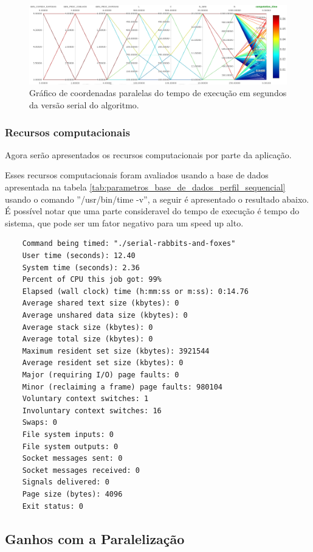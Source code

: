 \documentclass{article}
\begin{document}
\begin{figure}[H]
	\begin{center}
		\includegraphics[width=1.0\linewidth]{./parallel_coordinates.png}
	\end{center}
	\caption{Gráfico de coordenadas paralelas do tempo de execução em segundos da versão serial do algoritmo.}
	\label{fig:parallel_coordinates}
\end{figure}


\subsubsection{Recursos computacionais}

Agora serão apresentados os recursos computacionais por parte da aplicação.

Esses recursos computacionais foram avaliados usando a base de dados apresentada na tabela \ref{tab:parametros_base_de_dados_perfil_sequencial} usando o comando ''/usr/bin/time -v'', a seguir é apresentado o resultado abaixo. É possível notar que uma parte consideravel do tempo de execução é tempo do sistema, que pode ser um fator negativo para um speed up alto.


	{
		\scriptsize
		\begin{verbatim}
	Command being timed: "./serial-rabbits-and-foxes"
	User time (seconds): 12.40
	System time (seconds): 2.36
	Percent of CPU this job got: 99%
	Elapsed (wall clock) time (h:mm:ss or m:ss): 0:14.76
	Average shared text size (kbytes): 0
	Average unshared data size (kbytes): 0
	Average stack size (kbytes): 0
	Average total size (kbytes): 0
	Maximum resident set size (kbytes): 3921544
	Average resident set size (kbytes): 0
	Major (requiring I/O) page faults: 0
	Minor (reclaiming a frame) page faults: 980104
	Voluntary context switches: 1
	Involuntary context switches: 16
	Swaps: 0
	File system inputs: 0
	File system outputs: 0
	Socket messages sent: 0
	Socket messages received: 0
	Signals delivered: 0
	Page size (bytes): 4096
	Exit status: 0
\end{verbatim}
	}


\subsection{Ganhos com a Paralelização}
\end{document}
